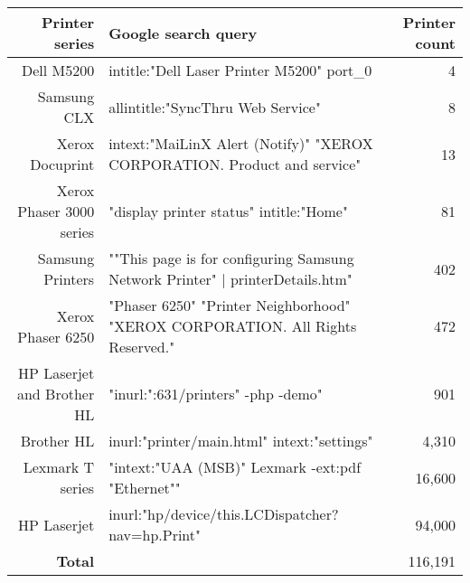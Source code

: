 \begin{table*}
\label{printer_dorks}
\begin{tabular}{r| p{9cm} | r}
    \hline
    \hline
    {\bf Printer series} & {\bf Google search query} & {\bf Printer count} \\
    \hline    
    Dell M5200 & intitle:"Dell Laser Printer M5200" port\_0 & 4 \\
    \hline
    Samsung CLX & allintitle:"SyncThru Web Service" & 8 \\
    \hline
    Xerox Docuprint & intext:"MaiLinX Alert (Notify)" "XEROX CORPORATION. Product and service" & 13 \\
    \hline
    Xerox Phaser 3000 series & "display printer status" intitle:"Home" & 81 \\
    \hline
    Samsung Printers & ""This page is for configuring Samsung Network Printer" | printerDetails.htm" & 402 \\
    \hline
    Xerox Phaser 6250 & "Phaser 6250" "Printer Neighborhood" "XEROX CORPORATION. All Rights Reserved." & 472 \\
    \hline
    HP Laserjet and Brother HL & "inurl:":631/printers" -php -demo" & 901 \\
    \hline
    Brother HL & inurl:"printer/main.html" intext:"settings" & 4,310 \\
    \hline
    Lexmark T series & "intext:"UAA (MSB)"  Lexmark -ext:pdf "Ethernet"" & 16,600 \\
    \hline
    HP Laserjet & inurl:"hp/device/this.LCDispatcher?nav=hp.Print" & 94,000 \\
    \hline
    \hline
    {\bf Total} & & 116,191 \\
    \hline
\end{tabular}
\end{table*}
